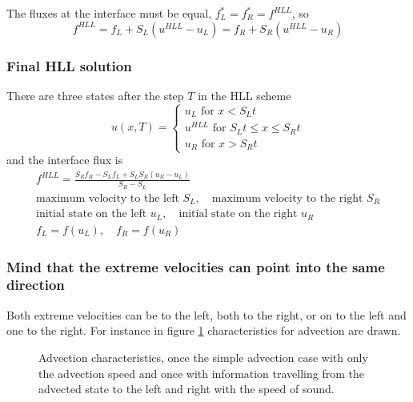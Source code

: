 The fluxes at the interface must be equal, $f_L^* = f_R^* = f^{HLL}$, so
\begin{equation}
    f^{H L L}=f_L+S_L\left(u^{H L L}-u_L\right)=f_R+S_R\left(u^{H L L}-u_R\right)
\end{equation}

\subsubsection{Final HLL solution}
There are three states after the step $T$ in the HLL scheme
\begin{equation}
    u(x, T)=\left\{\begin{array}{c}
    u_L \text { for } x<S_L t \\
    u^{H L L} \text { for } S_L t \leq x \leq S_R t \\
    u_R \text { for } x>S_R t
    \end{array}\right.
\end{equation}
and the interface flux is
\begin{equation}
    \begin{gathered}
        f^{H L L}=\frac{S_R f_R-S_L f_L+S_L S_R\left(u_R-u_L\right)}{S_R-S_L} \\
        \text{maximum velocity to the left } S_L, \quad \text{maximum velocity to the right } S_R \\
        \text{initial state on the left } u_L, \quad \text{initial state on the right } u_R \\
        f_L = f(u_L), \quad f_R = f(u_R)
    \end{gathered}
\end{equation}

\subsubsection{Mind that the extreme velocities can point into the same direction}
Both extreme velocities can be to the left, both to the right, or on to the left and one to the right.
For instance in figure \ref{fig:adv_char} characteristics for advection are drawn.

\begin{figure}[htb!]
    \centering
    
    \caption{Advection characteristics, once the simple advection case with only the advection speed and once with information travelling from the advected state to the left and right with the speed of sound.}
    \label{fig:adv_char}
\end{figure}

